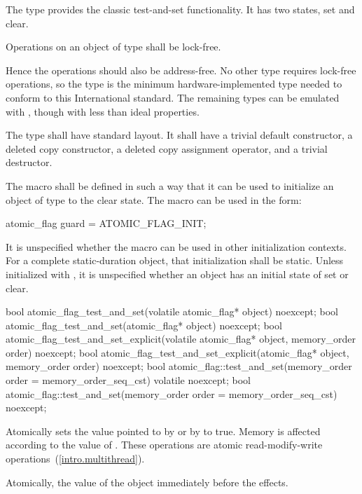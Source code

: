 \pnum
The  type provides the classic test-and-set functionality. It has two states, set and clear.

\pnum
Operations on an object of type  shall be lock-free. \begin{note} Hence
the operations should also be address-free. No other type requires lock-free operations,
so the  type is the minimum hardware-implemented type needed to
conform to this International standard. The remaining types can be emulated with
, though with less than ideal properties. \end{note}

\pnum
The  type shall have standard layout. It shall have a trivial default constructor, a deleted copy constructor, a deleted copy assignment operator, and a trivial destructor.

\pnum
The macro  shall be defined in such a way that it can be used to initialize an object of type  to the
clear state. The macro can be used in the form:
\begin{codeblock}
atomic_flag guard = ATOMIC_FLAG_INIT;
\end{codeblock}
It is unspecified whether the macro can be used in other initialization contexts.
For a complete static-duration object, that initialization shall be static.
Unless initialized with , it is unspecified whether an
 object has an initial state of set or clear.

%
%
%
\begin{itemdecl}
bool atomic_flag_test_and_set(volatile atomic_flag* object) noexcept;
bool atomic_flag_test_and_set(atomic_flag* object) noexcept;
bool atomic_flag_test_and_set_explicit(volatile atomic_flag* object, memory_order order) noexcept;
bool atomic_flag_test_and_set_explicit(atomic_flag* object, memory_order order) noexcept;
bool atomic_flag::test_and_set(memory_order order = memory_order_seq_cst) volatile noexcept;
bool atomic_flag::test_and_set(memory_order order = memory_order_seq_cst) noexcept;
\end{itemdecl}

\begin{itemdescr}
\pnum
\effects Atomically sets the value pointed to by  or by  to true. Memory is affected according to the value of
. These operations are atomic read-modify-write operations~(\ref{intro.multithread}).

\pnum
\returns Atomically, the value of the object immediately before the effects.
\end{itemdescr}

